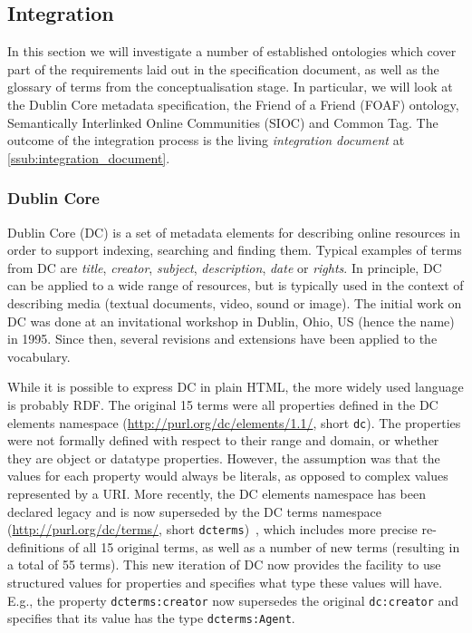 \documentclass[twoside]{fast_latex}
\begin{document}

\subsection{Integration} %
\label{sub:integration}

In this section we will investigate a number of established ontologies which cover part of the requirements laid out in the specification document, as well as the glossary of terms from the conceptualisation stage. In particular, we will look at the Dublin Core metadata specification, the Friend of a Friend (FOAF) ontology, Semantically Interlinked Online Communities (SIOC)  and Common Tag. 
The outcome of the integration process is the living \emph{integration document} at \ref{ssub:integration_document}.

\subsubsection{Dublin Core} %
\label{ssub:dublin_core}

Dublin Core (DC) is a set of metadata elements for describing online resources in order to support indexing, searching and finding them. Typical examples of terms from DC are \emph{title}, \emph{creator}, \emph{subject}, \emph{description}, \emph{date} or \emph{rights}. In principle, DC can be applied to a wide range of resources, but is typically used in the context of describing media (textual documents, video, sound or image). The initial work on DC was done at an invitational workshop in Dublin, Ohio, US (hence the name) in 1995. Since then, several revisions and extensions have been applied to the vocabulary.

While it is possible to express DC in plain HTML, the more widely used language is probably RDF. The original 15 terms were all properties defined in the DC elements namespace (\url{http://purl.org/dc/elements/1.1/}, short \texttt{dc}). The properties were not formally defined with respect to their range and domain, or whether they are object or datatype properties. However, the assumption was that the values for each property would always be literals, as opposed to complex values represented by a URI. More recently, the DC elements namespace has been declared legacy and is now superseded by the DC terms namespace (\url{http://purl.org/dc/terms/}, short \texttt{dcterms})~\cite{dcterms2008}, which includes more precise re-definitions of all 15 original terms, as well as a number of new terms (resulting in a total of 55 terms). This new iteration of DC now provides the facility to use structured values for properties and specifies what type these values will have. E.g., the property \texttt{dcterms:creator} now supersedes the original \texttt{dc:creator} and specifies that its value has the type \texttt{dcterms:Agent}.
\end{document}
